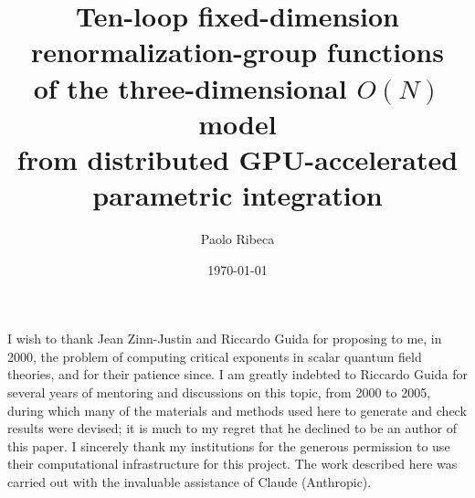 \expandafter\documentclass\expandafter[\PaperOptions]{revtex4-2}
\begin{document}
\title{Ten-loop fixed-dimension renormalization-group functions\\ of the three-dimensional
\texorpdfstring{$O(N)$}{O(N)} model\\ from distributed GPU-accelerated parametric integration}

\author{Paolo Ribeca}

\date{\today}



\maketitle






\begin{acknowledgments}
I wish to thank Jean Zinn-Justin and Riccardo Guida for proposing to me, in 2000, the problem of computing critical
exponents in scalar quantum field theories, and for their patience since. I am greatly indebted to Riccardo Guida for
several years of mentoring and discussions on this topic, from 2000 to 2005, during which many of the materials and
methods used here to generate and check results were devised; it is much to my regret that he declined to be an author
of this paper. I sincerely thank my institutions for the generous permission to use their computational infrastructure
for this project. The work described here was carried out with the invaluable assistance of Claude (Anthropic).
\end{acknowledgments}





\end{document}
